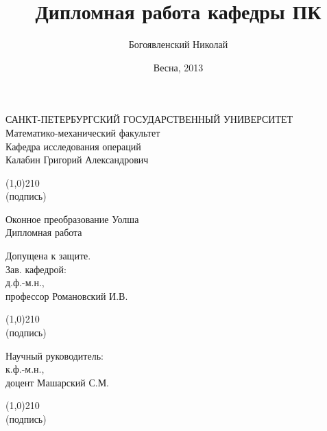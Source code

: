 \documentclass[a4paper, 14pt]{extarticle}
\title{Дипломная работа кафедры ПК}
\author{Богоявленский Николай}
\date{Весна, 2013}
\begin{document}
\begin{titlepage}
    \thispagestyle{empty}
    \begin{center}
        САНКТ-ПЕТЕРБУРГСКИЙ ГОСУДАРСТВЕННЫЙ УНИВЕРСИТЕТ\\
        Математико-механический факультет\\
        Кафедра исследования операций\\
        \bigskip
        \bigskip
        Калабин Григорий Александрович
    \end{center}
    \begin{flushright}
        \hspace{85mm} \line(1,0){210}\\
        \hspace{85mm} \small{(подпись)}
    \end{flushright}
    \begin{center}
        Оконное преобразование Уолша\\
        \bigskip
        \small{Дипломная работа}
    \end{center}
    \vfill
    \begin{flushleft}
        \hspace{85mm} \small{Допущена к защите.}\\
        \hspace{85mm} \small{Зав. кафедрой:}\\
        \hspace{85mm} \small{д.ф.-м.н.,}\\
        \hspace{85mm} \small{профессор Романовский И.В.}
        \begin{flushright}
           \hspace{85mm} \line(1,0){210}\\
           \small{(подпись)}
        \end{flushright}

        \hspace{85mm} \small{Научный руководитель:}\\
        \hspace{85mm} \small{к.ф.-м.н.,}\\
        \hspace{85mm} \small{доцент Машарский С.М.}
        \begin{flushright}
           \hspace{85mm} \line(1,0){210}\\
           \small{(подпись)}
        \end{flushright}
        

\end{flushleft}
\end{titlepage}
\end{document}
